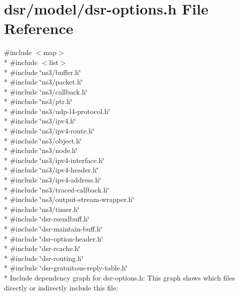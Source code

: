 \hypertarget{dsr-options_8h}{}\section{dsr/model/dsr-\/options.h File Reference}
\label{dsr-options_8h}
{\ttfamily \#include $<$map$>$}\\*
{\ttfamily \#include $<$list$>$}\\*
{\ttfamily \#include \char`\"{}ns3/buffer.\+h\char`\"{}}\\*
{\ttfamily \#include \char`\"{}ns3/packet.\+h\char`\"{}}\\*
{\ttfamily \#include \char`\"{}ns3/callback.\+h\char`\"{}}\\*
{\ttfamily \#include \char`\"{}ns3/ptr.\+h\char`\"{}}\\*
{\ttfamily \#include \char`\"{}ns3/udp-\/l4-\/protocol.\+h\char`\"{}}\\*
{\ttfamily \#include \char`\"{}ns3/ipv4.\+h\char`\"{}}\\*
{\ttfamily \#include \char`\"{}ns3/ipv4-\/route.\+h\char`\"{}}\\*
{\ttfamily \#include \char`\"{}ns3/object.\+h\char`\"{}}\\*
{\ttfamily \#include \char`\"{}ns3/node.\+h\char`\"{}}\\*
{\ttfamily \#include \char`\"{}ns3/ipv4-\/interface.\+h\char`\"{}}\\*
{\ttfamily \#include \char`\"{}ns3/ipv4-\/header.\+h\char`\"{}}\\*
{\ttfamily \#include \char`\"{}ns3/ipv4-\/address.\+h\char`\"{}}\\*
{\ttfamily \#include \char`\"{}ns3/traced-\/callback.\+h\char`\"{}}\\*
{\ttfamily \#include \char`\"{}ns3/output-\/stream-\/wrapper.\+h\char`\"{}}\\*
{\ttfamily \#include \char`\"{}ns3/timer.\+h\char`\"{}}\\*
{\ttfamily \#include \char`\"{}dsr-\/rsendbuff.\+h\char`\"{}}\\*
{\ttfamily \#include \char`\"{}dsr-\/maintain-\/buff.\+h\char`\"{}}\\*
{\ttfamily \#include \char`\"{}dsr-\/option-\/header.\+h\char`\"{}}\\*
{\ttfamily \#include \char`\"{}dsr-\/rcache.\+h\char`\"{}}\\*
{\ttfamily \#include \char`\"{}dsr-\/routing.\+h\char`\"{}}\\*
{\ttfamily \#include \char`\"{}dsr-\/gratuitous-\/reply-\/table.\+h\char`\"{}}\\*
Include dependency graph for dsr-\/options.h\+:
This graph shows which files directly or indirectly include this file\+:
